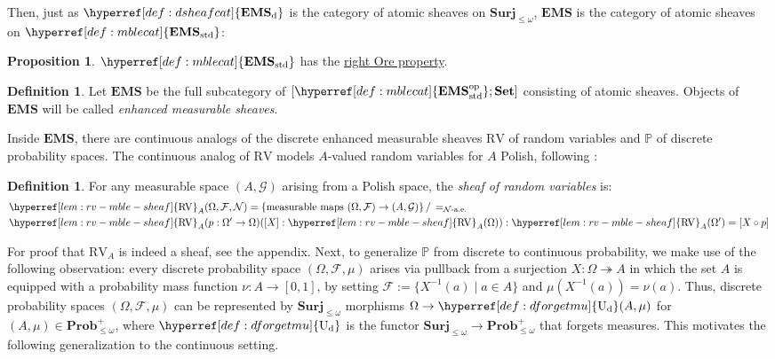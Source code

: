 \documentclass[
  sigconf,
  screen, ]{acmart}
\theoremstyle{definition}
\newtheorem{definition}[theorem]{Definition}
\newtheorem{proposition}[theorem]{Proposition}
\newcommand\calF{\mathcal F}
\newcommand\calG{\mathcal G}
\newcommand\calN{\mathcal N}
\newcommand\appref[1]{the appendix}
\newcommand\appref[1]{\cref{#1}}
\newcommand\nref[2]{\hyperref[#1]{#2}} \newcommand\checkhigh{{\huge{\color{red}\textbf{TODO: check}}}}
\newcommand\funcat[2]{[#1;#2]}
\newcommand\op{^{\rm op}}
\newcommand\Set{\mathbf{Set}}
\newcommand\dforgetmu{{\nref{def:dforgetmu}{\mathrm{U}_{\rm d}}}}
\newcommand\sheafcatadj{enhanced measurable}
\newcommand\texgoodsheaves{\sheafcatadj{} sheaves}
\newcommand\goodsheaves{\texgoodsheaves}
\newcommand\goodsheafcat{\mathbf{EMS}}
\newcommand\dgoodsheaves{discrete \sheafcatadj{} sheaves}
\newcommand\texStdMble{\mathbf{EMS}_{\rm std}}
\newcommand\StdMble{{\nref{def:mblecat}{\texStdMble}}}
\newcommand\StdMbleop{{\nref{def:mblecat}{\texStdMble\op}}}
\newcommand\CountProb{{\nref{def:CountProb}{\mathbf{Prob}_{\le\omega}^+}}}
\newcommand\CSur{{\nref{def:CSur}{\mathbf{Surj}_{\le\omega}}}}
\newcommand\discsubscript{_{\rm d}}
\newcommand\Dpspcs{{\nref{def:Dpspcs}{\mathbb{P}}}}
\newcommand\DRV{{\nref{prop:dwarp-in-the-atomic-sheaves}{\mathrm{RV}}}}
\newcommand\dsheafcat{{\nref{def:dsheafcat}{\goodsheafcat\discsubscript}}}
\newcommand\RV{\mathrm{RV}}
\newcommand\RVshf{{\nref{lem:rv-mble-sheaf}{\RV}}}
\newcommand\sheafcat{{\nref{def:sheafcat}{\goodsheafcat}}}
\begin{document}
Then, just as $\dsheafcat$ is the category of atomic sheaves on $\CSur$,
$\sheafcat$ is the category of atomic sheaves on $\StdMble$:
\begin{proposition} \label{lem:mble-right-ore}
  $\StdMble$ has the \nref{prop:csur-ore}{right Ore property}.
\end{proposition}

\begin{definition} \label{def:goodsheaf} \label{def:sheafcat}
  Let $\sheafcat$ be the full subcategory of $\funcat{\StdMbleop}\Set$
  consisting of atomic sheaves.
  Objects of $\sheafcat$ will be called
  \emph{\goodsheaves{}}.
\end{definition}

Inside $\sheafcat$, there are continuous analogs
of the \dgoodsheaves{} $\DRV$ of random variables
and $\Dpspcs$ of discrete probability spaces.
The continuous analog of $\DRV$ models
$A$-valued random variables for $A$ Polish,
following \citet{simpsonsheafslides,simpson2017probability}:

\begin{definition} \label{lem:rv-mble-sheaf}
  For any measurable space $(A,\calG)$
  arising from a Polish space,
  the \emph{sheaf of random variables} is:
  \begin{align*}
    &\RVshf_A(\Omega,\calF,\calN) = \{ \text{measurable maps }(\Omega,\calF)\to (A,\calG) \}\,/\,=_{\calN\text{-\rm a.e.}}
    \\
    &\RVshf_A(p : \Omega' \to \Omega)([X] : \RVshf_A(\Omega)) : \RVshf_A(\Omega') = [X\circ p]
  \end{align*}
\end{definition}

For proof that $\RVshf_A$ is indeed a sheaf, 
see \appref{app:lem:rv-mble-sheaf}.
Next, to generalize $\Dpspcs$ from discrete to continuous probability,
we make use of the following observation:
every discrete probability space $(\Omega,\calF,\mu)$
arises via pullback from a surjection $X : \Omega\twoheadrightarrow A$
in which the set $A$ is equipped
with a probability mass function $\nu : A\to [0,1]$,
by setting $\calF := \{X^{-1}(a) \mid a \in A\}$
and $\mu(X^{-1}(a)) = \nu(a)$.
Thus, discrete probability spaces $(\Omega,\calF,\mu)$
can be represented by $\CSur$ morphisms
$\Omega\to \dforgetmu(A,\mu)$ for $(A,\mu)\in\CountProb$,
where $\dforgetmu$ is the functor
$\CSur\to\CountProb$ that forgets measures.
This motivates the following generalization to the continuous setting.
\end{document}
